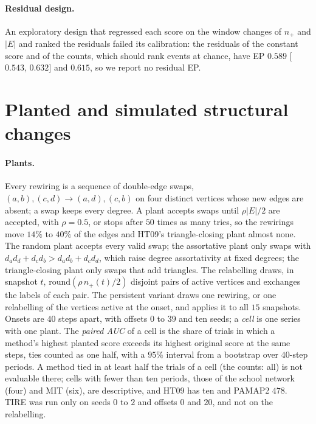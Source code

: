 \documentclass[11pt]{article}
\theoremstyle{dsplain}
\theoremstyle{definition}
\begin{document}
\paragraph{Residual design.} An exploratory design
that regressed each score on the window changes of $n_+$ and $|E|$ and ranked the residuals failed its
calibration: the residuals of the constant score and of the counts, which should rank events at chance, have
EP $0.589$ [$0.543$, $0.632$] and $0.615$, so we report no residual EP.

\section{Planted and simulated structural changes}
\label{app:plants}

\paragraph{Plants.} Every rewiring is a sequence of double-edge swaps, $(a,b),(c,d) \to (a,d),(c,b)$ on
four distinct vertices whose new edges are absent; a swap keeps every degree. A plant accepts swaps until
$\rho|E|/2$ are accepted, with $\rho = 0.5$, or stops after $50$ times as many tries, so the rewirings move
$14\%$ to $40\%$ of the edges and HT09's triangle-closing plant almost none. The random plant accepts every
valid swap; the assortative plant only swaps with $d_ad_d + d_cd_b > d_ad_b + d_cd_d$, which raise degree
assortativity at fixed degrees; the triangle-closing plant only swaps that add triangles. The relabelling
draws, in snapshot $t$, $\mathrm{round}(\rho\, n_+(t)/2)$ disjoint pairs of active vertices and exchanges
the labels of each pair. The persistent variant draws one rewiring, or one relabelling of the vertices active
at the onset, and applies it to all $15$ snapshots. Onsets are $40$ steps apart, with offsets $0$ to $39$ and
ten seeds; a \emph{cell} is one series with one plant. The \emph{paired AUC} of a cell is the share of trials
in which a method's highest planted score exceeds its highest original score at the same steps, ties counted
as one half, with a $95\%$ interval from a bootstrap over $40$-step periods. A method tied in at least half
the trials of a cell (the counts: all) is not evaluable there; cells with fewer than ten periods, those of
the school network (four) and MIT (six), are descriptive, and HT09 has ten and PAMAP2 $478$. TIRE was run only on seeds $0$ to $2$ and
offsets $0$ and $20$, and not on the relabelling.
\end{document}
